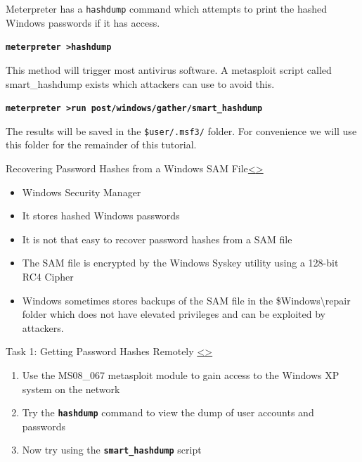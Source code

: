 \documentclass[12pt]{article}
\newcommand{\code}[1]{\texttt{\bfseries#1}}
\newenvironment{instructionblock}{\Large\bgroup}{\egroup}
\newcommand{\bi}{\begin{itemize}}
\newcommand{\ei}{\end{itemize}}
\begin{document}
Meterpreter has a \texttt{hashdump} command which attempts to print the hashed Windows passwords if it has access.

\code{meterpreter \textgreater  hashdump }
\cite{book}

This method will trigger most antivirus software. A metasploit script called smart\_hashdump exists which attackers can use to avoid this.

\code{meterpreter \textgreater run post/windows/gather/smart\_hashdump}

The results will be saved in the \texttt{\$user/.msf3/} folder. For convenience we will use this folder for the remainder of this tutorial.


\pagebreak

\begin{slide}{Recovering Password Hashes from a Windows SAM File}{\hyperref[slide 8]{\textless}\hyperref[slide 10]{\textgreater}}
	\begin{instructionblock}
			\bi
				\item Windows Security Manager
				\item It stores hashed Windows passwords
				\item It is not that easy to recover password hashes from a SAM file
			\ei
				
	\end{instructionblock}
\end{slide}
\vfill
\bi

\item The SAM file is encrypted by the Windows Syskey utility using a 128-bit RC4 Cipher

\item Windows sometimes stores backups of the SAM file in the \$Windows\textbackslash repair folder which does not have elevated privileges and can be exploited by attackers.


\ei\cite{book}

\pagebreak
\begin{slide}{Task 1: Getting Password Hashes Remotely }{\hyperref[slide 9]{\textless}\hyperref[slide 11]{\textgreater}}
	\begin{instructionblock}\
		\begin{enumerate}
			\item Use the MS08\_067 metasploit module to gain access to the Windows XP system on the network
			\item Try the \code{hashdump} command to view the dump of user accounts and passwords
			\item Now try using the \code{smart\_hashdump} script
		\end{enumerate}
	\end{instructionblock}
\end{slide}
\end{document}
